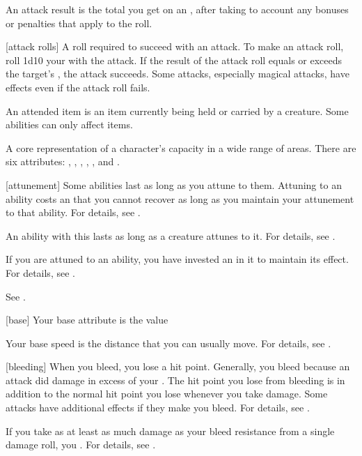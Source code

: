  An attack result is the total you get on an , after taking to account any bonuses or penalties that apply to the roll.

[attack rolls] A roll required to succeed with an attack.
To make an attack roll, roll 1d10 \add your  with the attack.
If the result of the attack roll equals or exceeds the target's , the attack succeeds.
Some attacks, especially magical attacks, have effects even if the attack roll fails.

 An attended item is an item currently being held or carried by a creature.
Some abilities can only affect  items.

 A core representation of a character's capacity in a wide range of areas. There are six attributes: , , , , , and .

[attunement] Some abilities last as long as you attune to them.
Attuning to an ability costs an  that you cannot recover as long as you maintain your attunement to that ability.
For details, see .

 An ability with this  lasts as long as a creature attunes to it.
For details, see .

 If you are attuned to an ability, you have invested an  in it to maintain its effect.
For details, see .

 See .

[base] Your base attribute is the value 

 Your base speed is the distance that you can usually move.
For details, see .

[bleeding] When you bleed, you lose a hit point.
Generally, you bleed because an attack did damage in excess of your .
The hit point you lose from bleeding is in addition to the normal hit point you lose whenever you take damage.
Some attacks have additional effects if they make you bleed.
For details, see .

 If you take as at least as much damage as your bleed resistance from a single damage roll, you .
For details, see .

